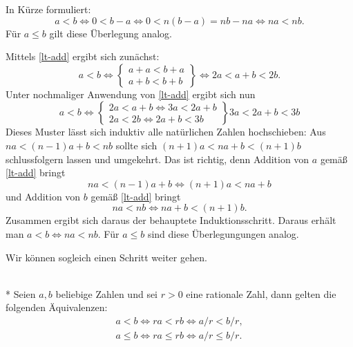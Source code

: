 In Kürze formuliert:
\begin{equation}
a<b\iff 0<b-a\iff 0<n(b-a)=nb-na \iff na<nb.
\end{equation}
Für $a\le b$ gilt diese Überlegung analog.\;\qedsymbol

Mittels \eqref{lt-add} ergibt sich zunächst:
\begin{equation}
a<b\iff \left\{
\begin{matrix}
a+a<b+a\\
a+b<b+b
\end{matrix}
\right\}
\iff 2a<a+b<2b.
\end{equation}
Unter nochmaliger Anwendung von \eqref{lt-add} ergibt sich
nun
\begin{equation}
a<b\iff \left\{
\begin{matrix}
2a<a+b \iff 3a<2a+b\\
2a<2b \iff 2a+b<3b
\end{matrix}
\right\} 3a<2a+b<3b
\end{equation}
Dieses Muster lässt sich induktiv alle natürlichen Zahlen hochschieben:
Aus $na<(n-1)a+b<nb$ sollte sich
$(n+1)a<na+b<(n+1)b$ schlussfolgern lassen und umgekehrt.
Das ist richtig, denn Addition von $a$ gemäß \eqref{lt-add} bringt
\begin{equation}
na<(n-1)a+b \iff (n+1)a < na+b
\end{equation}
und Addition von $b$ gemäß \eqref{lt-add} bringt
\begin{equation}
na<nb \iff na+b < (n+1)b.
\end{equation}
Zusammen ergibt sich daraus der behauptete Induktionsschritt. 
Daraus erhält man $a<b\iff na<nb$. Für $a\le b$ sind diese
Überlegungungen analog.\;\qedsymbol

Wir können sogleich einen Schritt weiter gehen.
\begin{Satz}\mbox{}\\*
Seien $a,b$ beliebige Zahlen und sei $r>0$ eine rationale Zahl,
dann gelten die folgenden Äquivalenzen:
\begin{gather}
\label{lt-mul-rat} a<b\iff ra<rb\iff a/r<b/r,\\
\label{lt-mul-rat} a\le b\iff ra\le rb\iff a/r\le b/r.
\end{gather}
\end{Satz}

